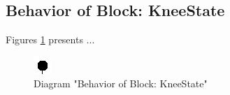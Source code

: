 \subsection{Behavior of Block: KneeState}
Figures \ref{fig:KneeStateKneeState25} presents ...
\begin{figure}[htb]
\centering
\includegraphics[width=\textwidth]{img_2_5.png}
\caption{Diagram "Behavior of Block: KneeState"}
\label{fig:KneeStateKneeState25}
\end{figure}

